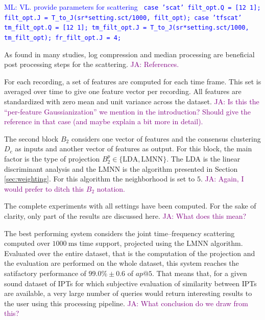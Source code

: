 \documentclass{bmcart}
\newcommand{\ipts}{IPTs\xspace}
\newcommand{\ml}[1]{\textcolor{blue}{ML: #1}\xspace}
\newcommand{\ja}[1]{\textcolor{purple}{JA: #1}\xspace}
\begin{document}
\ml{VL. provide parameters for scattering
\texttt{
case 'scat'
    filt\_opt.Q = [12 1];
    filt\_opt.J = T\_to\_J(sr*setting.sct/1000, filt\_opt);
case 'tfscat'
    tm\_filt\_opt.Q = [12 1];
    tm\_filt\_opt.J = T\_to\_J(sr*setting.sct/1000, tm\_filt\_opt);
    fr\_filt\_opt.J = 4;}}

As found in many studies, log compression and median processing are beneficial post processing steps for the scattering.
\ja{References.}

For each recording, a set of features are computed for each time frame.
This set is averaged over time to give one feature vector per recording.
All features are standardized with zero mean and unit variance across the dataset.
\ja{Is this the ``per-feature Gaussianization'' we mention in the introduction?
Should give the reference in that case (and maybe explain a bit more in detail).}%

The second block $B_2$ considers one vector of features and the consensus clustering $D_c$ as inputs and another vector of features as output.
For this block, the main factor is the type of projection $B_2^p \in \{ \text{LDA}, \text{LMNN} \}$.
The LDA is the linear discriminant analysis \cite{} and the LMNN is the algorithm presented in Section \ref{sec:weighting}.
For this algorithm the neighborhood is set to $5$.
\ja{Again, I would prefer to ditch this $B_2$ notation.}

The complete experiments with all settings have been computed.
For the sake of clarity, only part of the results are discussed here.
\ja{What does this mean?}%

The best performing system considers the joint time--frequency scattering computed over $1000~\mathrm{ms}$ time support, projected using the LMNN algorithm.
Evaluated over the entire dataset, that is the computation of the projection and the evaluation are performed on the whole dataset, this system reaches the satifactory performance of $99.0\% \pm 0.6$ of $ap@5$.
That means that, for a given sound dataset of \ipts for which subjective evaluation of similarity between \ipts are available, a very large number of queries would return interesting results to the user using this processing pipeline.
\ja{What conclusion do we draw from this?}
\end{document}
